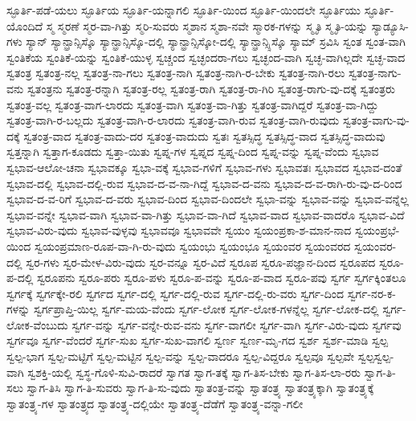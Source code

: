 {ಸ್ಫೂರ್ತಿ-ಪಡೆ-ಯಲು
ಸ್ಫೂರ್ತಿಯ
ಸ್ಫೂರ್ತಿ-ಯನ್ನಾಗಲಿ
ಸ್ಫೂರ್ತಿ-ಯಿಂದ
ಸ್ಫೂರ್ತಿ-ಯಿಂದಲೇ
ಸ್ಫೂರ್ತಿಯು
ಸ್ಫೂರ್ತಿ-ಯೊಂದಿದೆ
ಸ್ಮ
ಸ್ಮರಣೆ
ಸ್ಮರ-ವಾ-ಗಿತ್ತು
ಸ್ಮರಿ-ಸುವರು
ಸ್ಮಶಾನ
ಸ್ಮಶಾ-ನವೇ
ಸ್ಮಾರಕ-ಗಳನ್ನು
ಸ್ಮೃತಿ
ಸ್ಮೃತಿ-ಯನ್ನು
ಸ್ಯಾಡ್ಯೂಸಿ-ಗಳು
ಸ್ಯಾನ್
ಸ್ಯಾನ್ಫ್ರಾನ್ಸಿಸ್ಕೊ
ಸ್ಯಾನ್ಫ್ರಾನ್ಸಿಸ್ಕೊ-ದಲ್ಲಿ
ಸ್ಯಾನ್ಫ್ರಾನ್ಸಿಸ್ಕೋ-ದಲ್ಲಿ
ಸ್ಯಾನ್ಫ್ರಾನ್ಸ್ಸಿಸ್ಕೊ
ಸ್ಯಾಮ್
ಸ್ರವಿಸಿ
ಸ್ವಂತ
ಸ್ವಂತ-ವಾಗಿ
ಸ್ವಂತಿಕೆಯ
ಸ್ವಂತಿಕೆ-ಯನ್ನು
ಸ್ವಂತಿಕೆ-ಯುಳ್ಳ
ಸ್ವಚ್ಚಂದ
ಸ್ವಚ್ಛಂದರಾ-ಗಲು
ಸ್ವಚ್ಛಂದ-ವಾಗಿ
ಸ್ವಚ್ಛ-ವಾಗಿಲ್ಲದೇ
ಸ್ವಚ್ಛ-ವಾದ
ಸ್ವತಂತ್ರ
ಸ್ವತಂತ್ರ-ನಲ್ಲ
ಸ್ವತಂತ್ರ-ನಾ-ಗಲು
ಸ್ವತಂತ್ರ-ನಾಗಿ
ಸ್ವತಂತ್ರ-ನಾಗಿ-ರ-ಬೇಕು
ಸ್ವತಂತ್ರ-ನಾಗಿ-ರಲು
ಸ್ವತಂತ್ರ-ನಾಗು-ವನು
ಸ್ವತಂತ್ರನು
ಸ್ವತಂತ್ರ-ರನ್ನಾಗಿ
ಸ್ವತಂತ್ರ-ರಲ್ಲ
ಸ್ವತಂತ್ರ-ರಾಗಿ
ಸ್ವತಂತ್ರ-ರಾ-ಗಿರಿ
ಸ್ವತಂತ್ರ-ರಾಗು-ವು-ದಕ್ಕೆ
ಸ್ವತಂತ್ರರು
ಸ್ವತಂತ್ರ-ವಲ್ಲ
ಸ್ವತಂತ್ರ-ವಾಗ-ಲಾರದು
ಸ್ವತಂತ್ರ-ವಾಗಿ
ಸ್ವತಂತ್ರ-ವಾ-ಗಿತ್ತು
ಸ್ವತಂತ್ರ-ವಾಗಿದ್ದರೆ
ಸ್ವತಂತ್ರ-ವಾ-ಗಿದ್ದು
ಸ್ವತಂತ್ರ-ವಾಗಿ-ರ-ಬಲ್ಲದು
ಸ್ವತಂತ್ರ-ವಾಗಿ-ರ-ಲಾರದು
ಸ್ವತಂತ್ರ-ವಾಗಿ-ರುವ
ಸ್ವತಂತ್ರ-ವಾಗಿ-ರುವುದು
ಸ್ವತಂತ್ರ-ವಾಗು-ವು-ದಕ್ಕೆ
ಸ್ವತಂತ್ರ-ವಾದ
ಸ್ವತಂತ್ರ-ವಾದು-ದರ
ಸ್ವತಂತ್ರ-ವಾದುದು
ಸ್ವತಃ
ಸ್ವತಸ್ಸಿದ್ಧ
ಸ್ವತಸ್ಸಿದ್ಧ-ವಾದ
ಸ್ವತಸ್ಸಿದ್ಧ-ವಾದುವು
ಸ್ವತ್ತನ್ನಾಗಿ
ಸ್ವತ್ತಾಗ-ಕೂಡದು
ಸ್ವತ್ತಾ-ಯಿತು
ಸ್ವಪ್ನ-ಗಳ
ಸ್ವಪ್ನದ
ಸ್ವಪ್ನ-ದಿಂದ
ಸ್ವಪ್ನ-ವನ್ನು
ಸ್ವಪ್ನ-ವೆಂದು
ಸ್ವಭಾವ
ಸ್ವಭಾವ-ಆಲೋ-ಚನಾ
ಸ್ವಭಾವಕ್ಕೂ
ಸ್ವಭಾ-ವಕ್ಕೆ
ಸ್ವಭಾವ-ಗಳಿಗೆ
ಸ್ವಭಾವ-ಗಳು
ಸ್ವಭಾವತಃ
ಸ್ವಭಾವದ
ಸ್ವಭಾವ-ದಂತೆ
ಸ್ವಭಾವ-ದಲ್ಲಿ
ಸ್ವಭಾವ-ದಲ್ಲಿ-ರುವ
ಸ್ವಭಾವ-ದ-ವ-ನಾ-ಗಿದ್ದೆ
ಸ್ವಭಾವ-ದ-ವನು
ಸ್ವಭಾವ-ದ-ವ-ರಾಗಿ-ರು-ವು-ದ-ರಿಂದ
ಸ್ವಭಾವ-ದ-ವ-ರಿಗೆ
ಸ್ವಭಾವ-ದ-ವರು
ಸ್ವಭಾವ-ದಿಂದ
ಸ್ವಭಾವ-ದಿಂದಲೇ
ಸ್ವಭಾ-ವನ್ನು
ಸ್ವಭಾವ-ವನ್ನು
ಸ್ವಭಾವ-ವನ್ನೆಲ್ಲ
ಸ್ವಭಾವ-ವನ್ನೇ
ಸ್ವಭಾವ-ವಾಗಿ
ಸ್ವಭಾವ-ವಾ-ಗಿತ್ತು
ಸ್ವಭಾವ-ವಾ-ಗಿದೆ
ಸ್ವಭಾವ-ವಾದ
ಸ್ವಭಾವ-ವಾದರೊ
ಸ್ವಭಾವ-ವಿದೆ
ಸ್ವಭಾವ-ವಿರು-ವುದು
ಸ್ವಭಾವ-ವುಳ್ಳವು
ಸ್ವಭಾವವೂ
ಸ್ವಭಾವವೇ
ಸ್ವಯಂ
ಸ್ವಯಂಪ್ರಕಾ-ಶ-ಮಾನ-ನಾದ
ಸ್ವಯಂಪ್ರಭೆ-ಯಿಂದ
ಸ್ವಯಂಪ್ರಮಾಣ-ರೂಪ-ವಾ-ಗಿ-ರು-ವುದು
ಸ್ವಯಂಭು
ಸ್ವಯಂಭೂ
ಸ್ವಯಂವರ
ಸ್ವಯಂವರದ
ಸ್ವಯಂವರ-ದಲ್ಲಿ
ಸ್ವರ-ಗಳು
ಸ್ವರ-ಮೇಳ-ವಿರು-ವುದು
ಸ್ವರ-ವನ್ನೂ
ಸ್ವರ-ವಿದೆ
ಸ್ವರೂಪ
ಸ್ವರೂ-ಪಜ್ಞಾನ-ದಿಂದ
ಸ್ವರೂಪದ
ಸ್ವರೂ-ಪ-ದಲ್ಲಿ
ಸ್ವರೂಪನು
ಸ್ವರೂ-ಪರು
ಸ್ವರೂ-ಪಳು
ಸ್ವರೂ-ಪ-ವನ್ನು
ಸ್ವರೂ-ಪ-ವಾದ
ಸ್ವರೂ-ಪವು
ಸ್ವರ್ಗ
ಸ್ವರ್ಗಕ್ಕಿಂತಲೂ
ಸ್ವರ್ಗಕ್ಕೆ
ಸ್ವರ್ಗಕ್ಕೇ-ರಲಿ
ಸ್ವರ್ಗದ
ಸ್ವರ್ಗ-ದಲ್ಲಿ
ಸ್ವರ್ಗ-ದಲ್ಲಿ-ರುವ
ಸ್ವರ್ಗ-ದಲ್ಲಿ-ರು-ವರು
ಸ್ವರ್ಗ-ದಿಂದ
ಸ್ವರ್ಗ-ನರ-ಕ-ಗಳನ್ನು
ಸ್ವರ್ಗಪ್ರಾಪ್ತಿ-ಯಿಲ್ಲ
ಸ್ವರ್ಗ-ಮಯ-ವೆಂದು
ಸ್ವರ್ಗ-ಲೋಕ
ಸ್ವರ್ಗ-ಲೋಕ-ಗಳನ್ನೆಲ್ಲ
ಸ್ವರ್ಗ-ಲೋಕ-ದಲ್ಲಿ
ಸ್ವರ್ಗ-ಲೋಕ-ವೆಂಬುದು
ಸ್ವರ್ಗ-ವನ್ನು
ಸ್ವರ್ಗ-ವನ್ನೇ-ರುವ-ವನು
ಸ್ವರ್ಗ-ವಾಗಲೀ
ಸ್ವರ್ಗ-ವಾಗಿ
ಸ್ವರ್ಗ-ವಿರು-ವುದು
ಸ್ವರ್ಗವು
ಸ್ವರ್ಗವೂ
ಸ್ವರ್ಗ-ವೆಂದರೆ
ಸ್ವರ್ಗ-ಸುಖ
ಸ್ವರ್ಗ-ಸುಖ-ವಾಗಲಿ
ಸ್ವರ್ಣ
ಸ್ವರ್ಣ-ಮೃ-ಗದ
ಸ್ವರ್ಶ
ಸ್ವರ್ಶ-ಮಾಡಿ
ಸ್ವಲ್ಪ
ಸ್ವಲ್ಪ-ಭಾಗ
ಸ್ವಲ್ಪ-ಮಟ್ಟಿಗೆ
ಸ್ವಲ್ಪ-ಮಟ್ಟಿನ
ಸ್ವಲ್ಪ-ವನ್ನು
ಸ್ವಲ್ಪ-ವಾದರೂ
ಸ್ವಲ್ಪ-ವಿದ್ದರೂ
ಸ್ವಲ್ಪವೂ
ಸ್ವಲ್ಪವೇ
ಸ್ವಲ್ಪಸ್ವಲ್ಪ-ವಾಗಿ
ಸ್ವಶಕ್ತಿ-ಯಲ್ಲಿ
ಸ್ವಸ್ಥ-ಗೊಳಿ-ಸುವಿ-ರಾದರೆ
ಸ್ವಾಗತ
ಸ್ವಾಗ-ತಕ್ಕೆ
ಸ್ವಾಗ-ತಿಸ-ಬೇಕು
ಸ್ವಾಗ-ತಿಸ-ಲಾ-ರರು
ಸ್ವಾಗ-ತಿ-ಸಲು
ಸ್ವಾಗ-ತಿಸಿ
ಸ್ವಾಗ-ತಿ-ಸುವರು
ಸ್ವಾಗ-ತಿ-ಸು-ವುದು
ಸ್ವಾತಂತ್ರ-ವನ್ನು
ಸ್ವಾತಂತ್ರ್ಯ
ಸ್ವಾತಂತ್ರ್ಯಕ್ಕಾಗಿ
ಸ್ವಾತಂತ್ರ್ಯಕ್ಕೆ
ಸ್ವಾತಂತ್ರ್ಯ-ಗಳ
ಸ್ವಾತಂತ್ರ್ಯದ
ಸ್ವಾತಂತ್ರ್ಯ-ದಲ್ಲಿಯೇ
ಸ್ವಾತಂತ್ರ್ಯ-ದೆಡೆಗೆ
ಸ್ವಾತಂತ್ರ್ಯ-ವನ್ನಾ-ಗಲೀ
}
